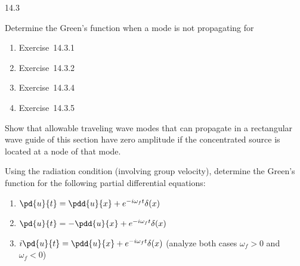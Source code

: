 \begin{exercises}{14.3}
\item Determine the Green's function when a mode is not propagating for
\begin{enumerate}
\item[(a)] Exercise~14.3.1
\item[(b)] Exercise~14.3.2
\item[(c)] Exercise~14.3.4
\item[(d)] Exercise~14.3.5
\end{enumerate}

\item Show that allowable traveling wave modes that can propagate in a rectangular wave guide of this section have zero amplitude if the concentrated source is located at a node of that mode.

\item Using the radiation condition (involving group velocity), determine the Green's function for the following partial differential equations:
\begin{enumerate}
\item[\starred (a)] $\pd{u}{t} = \pdd{u}{x} + e^{-i\omega_f t}\delta(x)$
\item[(b)] $\pd{u}{t} = -\pdd{u}{x} + e^{-i\omega_f t}\delta(x)$
\item[(c)] $i\pd{u}{t} = \pdd{u}{x} + e^{-i\omega_f t}\delta(x)$ (analyze both cases $\omega_f > 0$ and $\omega_f < 0$)
\end{enumerate}
\end{exercises}
